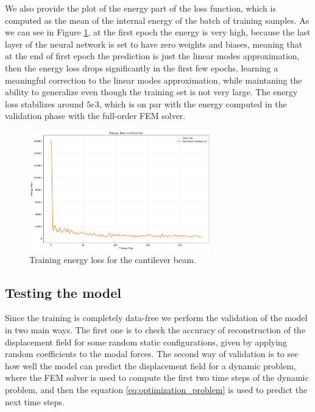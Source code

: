 We also provide the plot of the energy part of the loss function, which is computed as the mean of the internal energy of the batch of training samples. As we can see in Figure \ref{fig:training_energy_loss_beam}, at the first epoch the energy is very high, because the last layer of the neural network is set to have zero weights and biases, meaning that at the end of first epoch the prediction is just the linear modes approximation, then the energy loss drops significantly in the first few epochs, learning a meaningful correction to the linear modes approximation, while maintaning the ability to generalize even though the training set is not very large. The energy loss stabilizes around \(5e3\), which is on par with the energy computed in the validation phase with the full-order FEM solver.

\begin{figure}[H]
    \centering
    \includegraphics[width=0.7\textwidth]{Images/training_energy_smoothed.png}
    \caption{Training energy loss for the cantilever beam.}
    \label{fig:training_energy_loss_beam}
\end{figure}


\subsection{Testing the model}
\label{sec:testing_model}
Since the training is completely data-free we perform the validation of the model in two main ways. The first one is to check the accuracy of reconstruction of the displacement field for some random static configurations, given by applying random coefficients to the modal forces. The second way of validation is to see how well the model can predict the displacement field for a dynamic problem, where the FEM solver is used to compute the first two time steps of the dynamic problem, and then the equation \ref{eq:optimization_problem} is used to predict the next time steps. 

